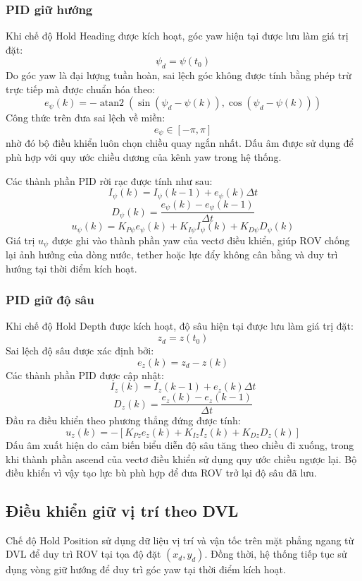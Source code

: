 \documentclass[../DoAn.tex]{subfiles}
\begin{document}
\subsubsection{PID giữ hướng}
Khi chế độ Hold Heading được kích hoạt, góc yaw hiện tại được lưu làm giá trị đặt:
\[
\psi_d = \psi(t_0)
\]
Do góc yaw là đại lượng tuần hoàn, sai lệch góc không được tính bằng phép trừ trực tiếp mà được chuẩn hóa theo:
\[
e_\psi(k) = -\operatorname{atan2} \left( \sin\left(\psi_d-\psi(k)\right), \cos\left(\psi_d-\psi(k)\right) \right)
\]
Công thức trên đưa sai lệch về miền:
\[
e_\psi \in [-\pi, \pi]
\]
nhờ đó bộ điều khiển luôn chọn chiều quay ngắn nhất. Dấu âm được sử dụng để phù hợp với quy ước chiều dương của kênh yaw trong hệ thống.

Các thành phần PID rời rạc được tính như sau:
\[
I_\psi(k) = I_\psi(k-1) + e_\psi(k)\Delta t
\]
\[
D_\psi(k) = \frac{e_\psi(k)-e_\psi(k-1)}{\Delta t}
\]
\[
u_\psi(k) = K_{P\psi}e_\psi(k) + K_{I\psi}I_\psi(k) + K_{D\psi}D_\psi(k)
\]
Giá trị $u_\psi$ được ghi vào thành phần yaw của vectơ điều khiển, giúp ROV chống lại ảnh hưởng của dòng nước, tether hoặc lực đẩy không cân bằng và duy trì hướng tại thời điểm kích hoạt.

\subsubsection{PID giữ độ sâu}
Khi chế độ Hold Depth được kích hoạt, độ sâu hiện tại được lưu làm giá trị đặt:
\[
z_d = z(t_0)
\]
Sai lệch độ sâu được xác định bởi:
\[
e_z(k) = z_d - z(k)
\]
Các thành phần PID được cập nhật:
\[
I_z(k) = I_z(k-1) + e_z(k)\Delta t
\]
\[
D_z(k) = \frac{e_z(k)-e_z(k-1)}{\Delta t}
\]
Đầu ra điều khiển theo phương thẳng đứng được tính:
\[
u_z(k) = -\left[ K_{Pz}e_z(k) + K_{Iz}I_z(k) + K_{Dz}D_z(k) \right]
\]
Dấu âm xuất hiện do cảm biến biểu diễn độ sâu tăng theo chiều đi xuống, trong khi thành phần ascend của vectơ điều khiển sử dụng quy ước chiều ngược lại. Bộ điều khiển vì vậy tạo lực bù phù hợp để đưa ROV trở lại độ sâu đã lưu.

\subsection{Điều khiển giữ vị trí theo DVL}

Chế độ Hold Position sử dụng dữ liệu vị trí và vận tốc trên mặt phẳng ngang từ DVL để duy trì ROV tại tọa độ đặt $(x_d, y_d)$. Đồng thời, hệ thống tiếp tục sử dụng vòng giữ hướng để duy trì góc yaw tại thời điểm kích hoạt.
\end{document}

